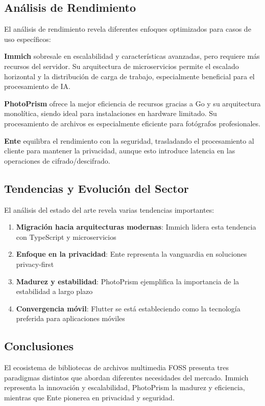 \subsection{Análisis de Rendimiento}

El análisis de rendimiento revela diferentes enfoques optimizados para casos de uso específicos:

\textbf{Immich} sobresale en escalabilidad y características avanzadas, pero requiere más recursos del servidor. Su arquitectura de microservicios permite el escalado horizontal y la distribución de carga de trabajo, especialmente beneficial para el procesamiento de IA.

\textbf{PhotoPrism} ofrece la mejor eficiencia de recursos gracias a Go y su arquitectura monolítica, siendo ideal para instalaciones en hardware limitado. Su procesamiento de archivos es especialmente eficiente para fotógrafos profesionales.

\textbf{Ente} equilibra el rendimiento con la seguridad, trasladando el procesamiento al cliente para mantener la privacidad, aunque esto introduce latencia en las operaciones de cifrado/descifrado.

\subsection{Tendencias y Evolución del Sector}

El análisis del estado del arte revela varias tendencias importantes:

\begin{enumerate}
    \item \textbf{Migración hacia arquitecturas modernas}: Immich lidera esta tendencia con TypeScript y microservicios
    \item \textbf{Enfoque en la privacidad}: Ente representa la vanguardia en soluciones privacy-first
    \item \textbf{Madurez y estabilidad}: PhotoPrism ejemplifica la importancia de la estabilidad a largo plazo
    \item \textbf{Convergencia móvil}: Flutter se está estableciendo como la tecnología preferida para aplicaciones móviles
\end{enumerate}

\subsection{Conclusiones}

El ecosistema de bibliotecas de archivos multimedia FOSS presenta tres paradigmas distintos que abordan diferentes necesidades del mercado. Immich representa la innovación y escalabilidad, PhotoPrism la madurez y eficiencia, mientras que Ente pionerea en privacidad y seguridad.

